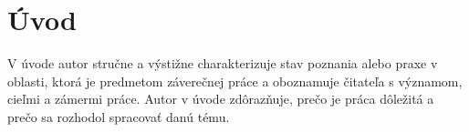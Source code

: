 \section*{Úvod}
\label{text-start}

V úvode autor stručne a výstižne charakterizuje stav poznania alebo praxe v oblasti, ktorá je predmetom záverečnej práce a oboznamuje čitateľa s významom, cieľmi a zámermi práce. Autor v úvode zdôrazňuje, prečo je práca dôležitá a prečo sa rozhodol spracovať danú tému.